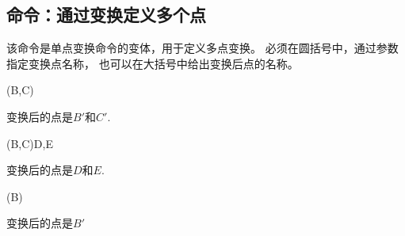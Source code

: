 \documentclass[../main.tex]{subfiles}
\begin{document}
\subsection{命令：通过变换定义多个点}

该命令是单点变换命令的变体，用于定义多点变换。
必须在圆括号中，通过参数指定变换点名称，
也可以在大括号中给出变换后点的名称。

\begin{tkzltxexample}[small]
\tkzDefPointsBy[translation= from A to A'](B,C){}
\end{tkzltxexample}

变换后的点是$B'$和$C'$.

\begin{tkzltxexample}[small]
\tkzDefPointsBy[translation= from A to A'](B,C){D,E}
\end{tkzltxexample}

变换后的点是$D$和$E$.

\begin{tkzltxexample}[small]
\tkzDefPointsBy[translation= from A to A'](B)
\end{tkzltxexample}

变换后的点是$B'$

\newpage
\end{document}
